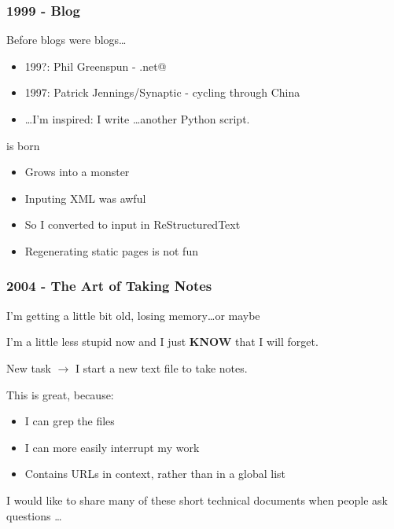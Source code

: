 \documentclass{beamer}
\begin{document}
\begin{frame}[fragile]
  \frametitle{1999 - Blog}

  Before blogs were blogs\dots

  \begin{itemize}
  \item 199?: Phil Greenspun - \verb@photo.net@
  \item 1997: Patrick Jennings/Synaptic - cycling through China
  \item \dots I'm inspired: I write \dots another Python script.
  \end{itemize}

\vfill\pause

  \verb@adventures@ is born
  \begin{itemize}
    \item Grows into a monster
    \item Inputing XML was awful
    \item So I converted to input in ReStructuredText
    \item Regenerating static pages is not fun
  \end{itemize}

\end{frame}



% 
% 


\begin{frame}[fragile]
  \frametitle{2004 - The Art of Taking Notes}

  I'm getting a little bit old, losing memory\dots  \pause or maybe \\

\vfill

  I'm a little less stupid now and I just \textbf{KNOW} that I will forget. \\

\vfill\pause

  New task $\rightarrow$ I start a new text file to take notes.

  This is great, because:
  \begin{itemize}
    \item I can grep the files

    \item I can more easily interrupt my work

    \item Contains URLs in context, rather than in a global list

  \end{itemize}

  I would like to share many of these short technical documents when people
  ask questions \dots

\end{frame}
\end{document}
